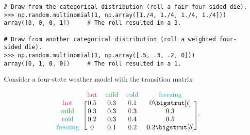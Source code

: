 \begin{lstlisting}
# Draw from the categorical distribution (roll a fair four-sided die).
>>> np.random.multinomial(1, np.array([1./4, 1./4, 1./4, 1./4]))
array([0, 0, 0, 1])     # The roll resulted in a 3.

# Draw from another categorical distribution (roll a weighted four-sided die).
>>> np.random.multinomial(1, np.array([.5, .3, .2, 0]))
array([0, 1, 0, 0])     # The roll resulted in a 1.
\end{lstlisting}

Consider a four-state weather model with the transition matrix
\begin{comment} %
\begin{tikzpicture}[normalcircle/.style={draw,circle,minimum size=1.5cm,fill=none,thick,node distance=3.5cm}]
\node[normalcircle] (A) {\textcolor{red}{hot}};
\node[normalcircle] (B) [above of=A] {\textcolor{green}{mild}};
\node[normalcircle] (C) [right of=B] {\textcolor{blue}{cold}};
\node[normalcircle] (D) [below of=C] {\textcolor{cyan}{freezing}};
\draw[bend right=60,thick,->,>=stealth'] (D) edge (C);
\draw[bend left=60,thick,->,>=stealth',blue] (B) edge (C);
\draw[bend right=60,thick,->,>=stealth',blue] (B) edge (A);
\foreach \a/\b in {A/B,A/C,A/D,C/B,C/D} \draw[thick,->,>=stealth'] (\a) edge (\b);
\draw[thick,->,>=stealth',blue] (B) edge (D);
\draw[thick,->,>=stealth',shorten >=1pt,blue] (B) to [out=110,in=170,loop,looseness=4.5] (B);
\end{tikzpicture}
\end{comment}
\begin{align*}
\begin{blockarray}{ccccc}
& \text{\textcolor{red}{hot}} & \text{\textcolor[rgb]{0,.6,0}{mild}} & \text{\textcolor{blue}{cold}} & \text{\textcolor{cyan}{freezing}} \\
\begin{block}{c[cccc]}
\text{\textcolor{red}{hot}}              & 0.5 & 0.3 & 0.1 & 0   \topstrut \\
\text{\textcolor[rgb]{0,.6,0}{mild}}     & 0.3 & 0.3 & 0.3 & 0.3 \\
\text{\textcolor{blue}{cold}}            & 0.2 & 0.3 & 0.4 & 0.5 \\
\text{\textcolor{cyan}{freezing}}        &   0 & 0.1 & 0.2 & 0.2 \botstrut \\
\end{block}\end{blockarray}.
\end{align*}
